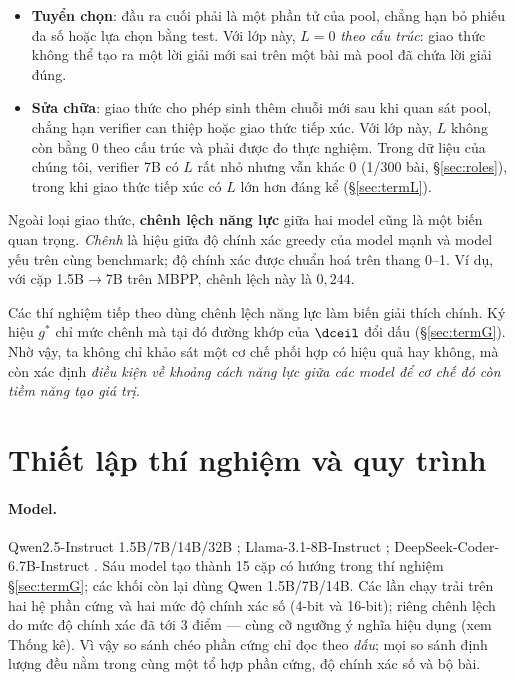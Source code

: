 \begin{itemize}\itemsep1pt
\item \textbf{Tuyển chọn}: đầu ra cuối phải là một phần tử của pool, chẳng hạn bỏ phiếu đa số
      hoặc lựa chọn bằng test. Với lớp này, $L=0$ \emph{theo cấu trúc}: giao thức không thể tạo
      ra một lời giải mới sai trên một bài mà pool đã chứa lời giải đúng.
\item \textbf{Sửa chữa}: giao thức cho phép sinh thêm chuỗi mới sau khi quan sát pool, chẳng
      hạn verifier can thiệp hoặc giao thức tiếp xúc. Với lớp này, $L$ không còn bằng 0 theo
      cấu trúc và phải được đo thực nghiệm. Trong dữ liệu của chúng tôi, verifier 7B có $L$ rất
      nhỏ nhưng vẫn khác 0 (1/300 bài, \S\ref{sec:roles}), trong khi giao thức tiếp xúc có $L$
      lớn hơn đáng kể (\S\ref{sec:termL}).
\end{itemize}

Ngoài loại giao thức, \textbf{chênh lệch năng lực} giữa hai model cũng là một biến quan trọng.
\emph{Chênh} là hiệu giữa độ chính xác greedy của model mạnh và model yếu trên cùng benchmark;
độ chính xác được chuẩn hoá trên thang 0--1. Ví dụ, với cặp 1.5B$\to$7B trên MBPP, chênh lệch
này là $0{,}244$.

Các thí nghiệm tiếp theo dùng chênh lệch năng lực làm biến giải thích chính. Ký hiệu $g^\ast$
chỉ mức chênh mà tại đó đường khớp của $\dceil$ đổi dấu (\S\ref{sec:termG}). Nhờ vậy, ta không
chỉ khảo sát một cơ chế phối hợp có hiệu quả hay không, mà còn xác định \emph{điều kiện về
khoảng cách năng lực giữa các model để cơ chế đó còn tiềm năng tạo giá trị}.


\section{Thiết lập thí nghiệm và quy trình}\label{sec:setup}


\paragraph{Model.} Qwen2.5-Instruct 1.5B/7B/14B/32B \cite{yang2024}; Llama-3.1-8B-Instruct
\cite{grattafiori2024}; DeepSeek-Coder-6.7B-Instruct \cite{guo2024}. Sáu model tạo thành 15 cặp
có hướng trong thí nghiệm \S\ref{sec:termG}; các khối còn lại dùng Qwen 1.5B/7B/14B. Các lần
chạy trải trên hai hệ phần cứng và hai mức độ chính xác số (4-bit và 16-bit); riêng chênh lệch
do mức độ chính xác đã tới 3 điểm --- cùng cỡ ngưỡng ý nghĩa hiệu dụng (xem Thống kê). Vì vậy
so sánh chéo phần cứng chỉ đọc theo \emph{dấu}; mọi so sánh định lượng đều nằm trong cùng một
tổ hợp phần cứng, độ chính xác số và bộ bài.

